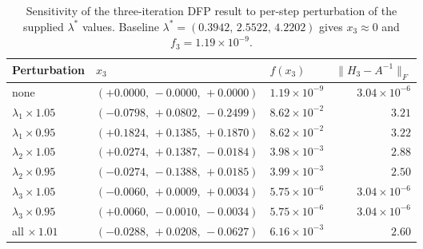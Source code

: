 \documentclass[11pt,a4paper]{article}
\begin{document}
\begin{table}[htbp]
\centering
\caption{Sensitivity of the three-iteration DFP result to per-step perturbation of the supplied \(\lambda^{\ast}\) values. Baseline \(\lambda^{\ast}=(0.3942,\,2.5522,\,4.2202)\) gives \(x_{3}\approx 0\) and \(f_{3}=1.19\!\times\!10^{-9}\).}
\label{tab:q6-sensitivity}
\begin{tabular}{lllr}
\toprule
Perturbation & \(x_{3}\) & \(f(x_{3})\) & \(\|H_{3}-A^{-1}\|_{F}\)\\
\midrule
none                                & \((+0.0000,\,-0.0000,\,+0.0000)\) & \(1.19\!\times\!10^{-9}\)  & \(3.04\!\times\!10^{-6}\)\\
\(\lambda_{1}\!\times\!1.05\)       & \((-0.0798,\,+0.0802,\,-0.2499)\) & \(8.62\!\times\!10^{-2}\) & \(3.21\)\\
\(\lambda_{1}\!\times\!0.95\)       & \((+0.1824,\,+0.1385,\,+0.1870)\) & \(8.62\!\times\!10^{-2}\) & \(3.22\)\\
\(\lambda_{2}\!\times\!1.05\)       & \((+0.0274,\,+0.1387,\,-0.0184)\) & \(3.98\!\times\!10^{-3}\) & \(2.88\)\\
\(\lambda_{2}\!\times\!0.95\)       & \((-0.0274,\,-0.1388,\,+0.0185)\) & \(3.99\!\times\!10^{-3}\) & \(2.50\)\\
\(\lambda_{3}\!\times\!1.05\)       & \((-0.0060,\,+0.0009,\,+0.0034)\) & \(5.75\!\times\!10^{-6}\) & \(3.04\!\times\!10^{-6}\)\\
\(\lambda_{3}\!\times\!0.95\)       & \((+0.0060,\,-0.0010,\,-0.0034)\) & \(5.75\!\times\!10^{-6}\) & \(3.04\!\times\!10^{-6}\)\\
all \(\times\,1.01\)                & \((-0.0288,\,+0.0208,\,-0.0627)\) & \(6.16\!\times\!10^{-3}\) & \(2.60\)\\
\bottomrule
\end{tabular}
\end{table}
\end{document}
